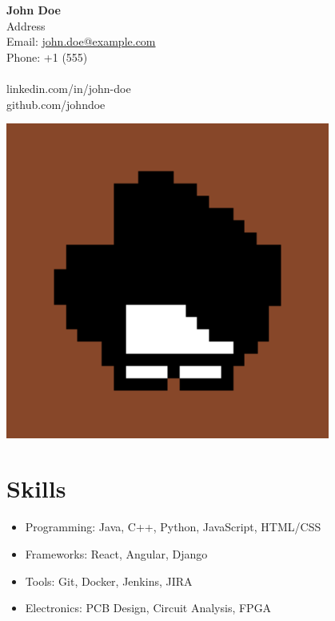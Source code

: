 \documentclass[a4paper,12pt]{article} %
\begin{document}
\noindent
\begin{minipage}[c]{0.6\textwidth}
    {\LARGE \bfseries John Doe}\\
    Address\\
    Email: \href{mailto:john.doe@example.com}{john.doe@example.com}\\
    Phone: +1 (555)\\
    \bigskip\\
    linkedin.com/in/john-doe\\
    github.com/johndoe
\end{minipage}
\hfill
\begin{minipage}[c]{0.3\textwidth}
    \includegraphics[width=0.8\textwidth]{../../assets/photo.jpg}
\end{minipage}

\section*{Skills}
\begin{itemize}[leftmargin=*]
    \item Programming: Java, C++, Python, JavaScript, HTML/CSS
    \item Frameworks: React, Angular, Django
    \item Tools: Git, Docker, Jenkins, JIRA
    \item Electronics: PCB Design, Circuit Analysis, FPGA
\end{itemize}
\end{document}
